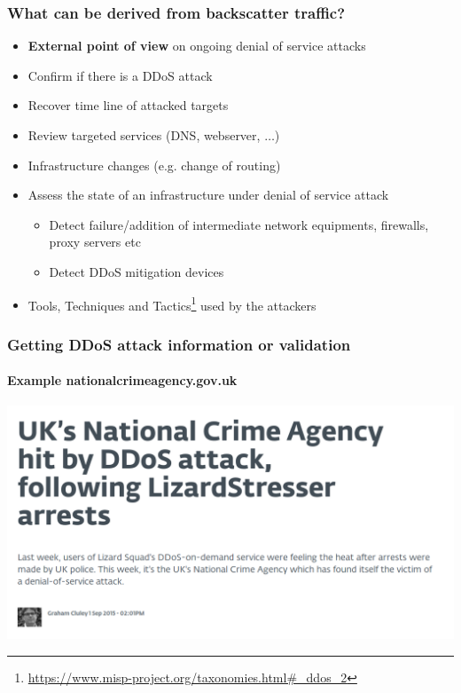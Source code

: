 \documentclass{beamer}
\begin{document}
\begin{frame}
\frametitle{What can be derived from backscatter traffic?}
\begin{itemize}
    \item {\bf External point of view} on ongoing denial of service attacks
    \item Confirm if there is a DDoS attack
    \item Recover time line of attacked targets
    \item Review targeted services (DNS, webserver, $\dots$)
    \item Infrastructure changes (e.g. change of routing)
    \item Assess the state of an infrastructure under denial of service attack
    \begin{itemize}
        \item Detect failure/addition of intermediate network equipments, firewalls, proxy servers etc
        \item Detect DDoS mitigation devices
    \end{itemize}
    \item Tools, Techniques and Tactics\footnote{\url{https://www.misp-project.org/taxonomies.html\#\_ddos\_2}} used by the attackers
\end{itemize}
\end{frame}

\begin{frame}
\frametitle{Getting DDoS attack information or validation}
\framesubtitle{Example nationalcrimeagency.gov.uk}
\includegraphics[scale=0.3]{article.png}
\end{frame}
\end{document}
